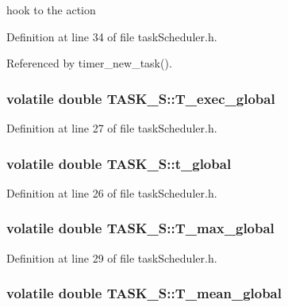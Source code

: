 hook to the action 



Definition at line 34 of file task\-Scheduler.\-h.



Referenced by timer\-\_\-new\-\_\-task().

\hypertarget{structTASK__S_ae06b712fd9963cff8192e9ef3140bc6d}{
\subsubsection[{T\-\_\-exec\-\_\-global}]{\setlength{\rightskip}{0pt plus 5cm}volatile double T\-A\-S\-K\-\_\-\-S\-::\-T\-\_\-exec\-\_\-global}}\label{structTASK__S_ae06b712fd9963cff8192e9ef3140bc6d}


Definition at line 27 of file task\-Scheduler.\-h.

\hypertarget{structTASK__S_a29a175bdd4b9f880a2b69bb5186e3c7e}{
\subsubsection[{t\-\_\-global}]{\setlength{\rightskip}{0pt plus 5cm}volatile double T\-A\-S\-K\-\_\-\-S\-::t\-\_\-global}}\label{structTASK__S_a29a175bdd4b9f880a2b69bb5186e3c7e}


Definition at line 26 of file task\-Scheduler.\-h.

\hypertarget{structTASK__S_a430c874cbf361b6dbc75ad1540880948}{
\subsubsection[{T\-\_\-max\-\_\-global}]{\setlength{\rightskip}{0pt plus 5cm}volatile double T\-A\-S\-K\-\_\-\-S\-::\-T\-\_\-max\-\_\-global}}\label{structTASK__S_a430c874cbf361b6dbc75ad1540880948}


Definition at line 29 of file task\-Scheduler.\-h.

\hypertarget{structTASK__S_a9ebae87e1b64869f328a47473f2ea7d7}{
\subsubsection[{T\-\_\-mean\-\_\-global}]{\setlength{\rightskip}{0pt plus 5cm}volatile double T\-A\-S\-K\-\_\-\-S\-::\-T\-\_\-mean\-\_\-global}}\label{structTASK__S_a9ebae87e1b64869f328a47473f2ea7d7}


